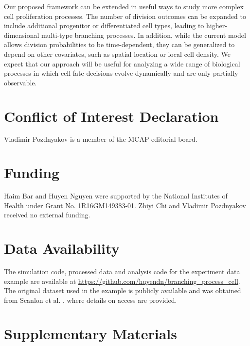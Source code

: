 \documentclass[pdflatex,sn-mathphys-num]{sn-jnl}
\theoremstyle{thmstyleone}%
\theoremstyle{thmstyletwo}%
\theoremstyle{thmstylethree}%
\begin{document}
Our proposed framework can be extended in useful ways to study more complex cell proliferation processes. The number of division outcomes can be expanded to include additional progenitor or differentiated cell types, leading to higher-dimensional multi-type branching processes. In addition, while the current model allows division probabilities to be time-dependent, they can be generalized to depend on other covariates, such as spatial location or local cell density. We expect that our approach will be useful for analyzing a wide range of biological processes in which cell fate decisions evolve dynamically and are only partially observable.

\section*{Conflict of Interest Declaration}
Vladimir Pozdnyakov is a member of the MCAP editorial board.

\section*{Funding}
Haim Bar and Huyen Nguyen were supported by the National Institutes of Health under Grant No. 1R16GM149383-01. Zhiyi Chi and Vladimir Pozdnyakov received no external funding.

\section*{Data Availability}
The simulation code, processed data and analysis code for the experiment data example are available at \url{https://github.com/huyendn/branching_process_cell}. The original dataset used in the example is publicly available and was obtained from Scanlon et al. \cite{Sc2022}, where details on access are provided.

\section*{Supplementary Materials} \label{supplement}
\end{document}
